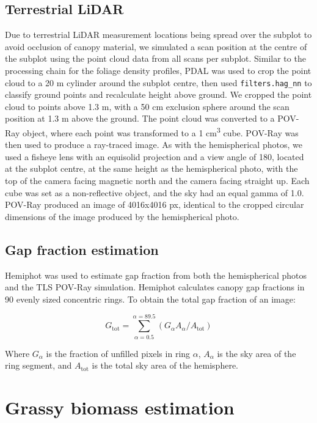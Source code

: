 \documentclass[11pt,a4paper]{article}
\begin{document}
\subsection{Terrestrial LiDAR}

Due to terrestrial LiDAR measurement locations being spread over the subplot to avoid occlusion of canopy material, we simulated a scan position at the centre of the subplot using the point cloud data from all scans per subplot. Similar to the processing chain for the foliage density profiles, PDAL was used to crop the point cloud to a 20 m cylinder around the subplot centre, then used \texttt{filters.hag\_nn} to classify ground points and recalculate height above ground. We cropped the point cloud to points above 1.3 m, with a 50 cm exclusion sphere around the scan position at 1.3 m above the ground. The point cloud was converted to a POV-Ray object, where each point was transformed to a 1 cm\textsuperscript{3} cube. POV-Ray was then used to produce a ray-traced image. As with the hemispherical photos, we used a fisheye lens with an equisolid projection and a view angle of 180\textdegree, located at the subplot centre, at the same height as the hemispherical photo, with the top of the camera facing magnetic north and the camera facing straight up. Each cube was set as a non-reflective object, and the sky had an equal gamma of 1.0. POV-Ray produced an image of 4016x4016 px, identical to the cropped circular dimensions of the image produced by the hemispherical photo.

\subsection{Gap fraction estimation}

Hemiphot \citep{} was used to estimate gap fraction from both the hemispherical photos and the TLS POV-Ray simulation. Hemiphot calculates canopy gap fractions in 90 evenly sized concentric rings. To obtain the total gap fraction of an image:

\begin{equation}
	G_{\text{tot}} = \sum_{\alpha{} = 0.5}^{\alpha{} = 89.5}(G_{\alpha{}} A_{\alpha{}} / A_{\text{tot}})
\end{equation}

Where $G_{\alpha{}}$ is the fraction of unfilled pixels in ring $\alpha{}$, $A_{\alpha{}}$ is the sky area of the ring segment, and $A_{\text{tot}}$ is the total sky area of the hemisphere.

\section{Grassy biomass estimation}
\end{document}
